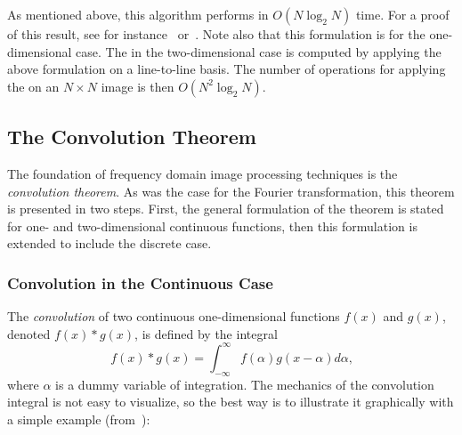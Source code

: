 As mentioned above, this algorithm performs in $O(N\log_{2}N)$ time.
For a proof of this result, see for instance~\cite{brigham}
or~\cite{digim}.  Note also that this formulation is for the
one-dimensional case.  The {\fft} in the two-dimensional case is
computed by applying the above formulation on a line-to-line basis.
The number of operations for applying the {\fft} on an $N\times N$
image is then $O(N^{2}\log_{2}N)$.


\subsection{The Convolution Theorem}
\label{image:frequency:convolution}

The foundation of frequency domain image processing techniques is the
{\em convolution theorem\/}.  As was the case for the Fourier
transformation, this theorem is presented in two steps.  First, the
general formulation of the theorem is stated for one- and
two-dimensional continuous functions, then this formulation is
extended to include the discrete case.

\subsubsection{Convolution in the Continuous Case}

The {\em convolution\/} of two continuous one-dimensional functions
$f(x)$ and $g(x)$, denoted $f(x)\ast g(x)$, is defined by the integral
\begin{equation}
\label{eq:convolution:def}
  f(x)\ast g(x)=\int_{-\infty}^{\infty}f(\alpha)g(x-\alpha)d\alpha\mbox{,}
\end{equation}
where $\alpha$ is a dummy variable of integration.  The mechanics of
the convolution integral is not easy to visualize, so the best way is
to illustrate it graphically with a simple example
(from~\cite{digim}):

